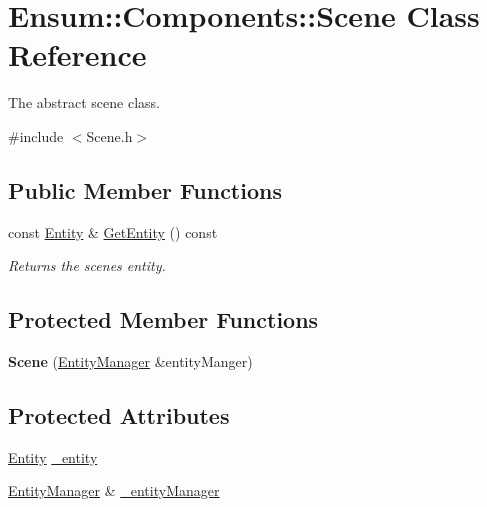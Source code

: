 \hypertarget{class_ensum_1_1_components_1_1_scene}{}\section{Ensum\+:\+:Components\+:\+:Scene Class Reference}
\label{class_ensum_1_1_components_1_1_scene}


The abstract scene class.  




{\ttfamily \#include $<$Scene.\+h$>$}

\subsection*{Public Member Functions}
\begin{DoxyCompactItemize}
\item 
const \hyperlink{class_ensum_1_1_components_1_1_entity}{Entity} \& \hyperlink{class_ensum_1_1_components_1_1_scene_a958da01af0ce1c544ccb09b69b6d3cfc}{Get\+Entity} () const 
\begin{DoxyCompactList}\small\item\em Returns the scenes entity. \end{DoxyCompactList}\end{DoxyCompactItemize}
\subsection*{Protected Member Functions}
\begin{DoxyCompactItemize}
\item 
{\bfseries Scene} (\hyperlink{class_ensum_1_1_components_1_1_entity_manager}{Entity\+Manager} \&entity\+Manger)\hypertarget{class_ensum_1_1_components_1_1_scene_ad73cdf49ba7fe521e5572710192d0aed}{}\label{class_ensum_1_1_components_1_1_scene_ad73cdf49ba7fe521e5572710192d0aed}

\end{DoxyCompactItemize}
\subsection*{Protected Attributes}
\begin{DoxyCompactItemize}
\item 
\hyperlink{class_ensum_1_1_components_1_1_entity}{Entity} \hyperlink{class_ensum_1_1_components_1_1_scene_a8d36e81874a5b07e3edbd8720b8b289e}{\+\_\+entity}
\item 
\hyperlink{class_ensum_1_1_components_1_1_entity_manager}{Entity\+Manager} \& \hyperlink{class_ensum_1_1_components_1_1_scene_af7eb8e3279c5b6768f442ae05b44e75f}{\+\_\+entity\+Manager}
\end{DoxyCompactItemize}


